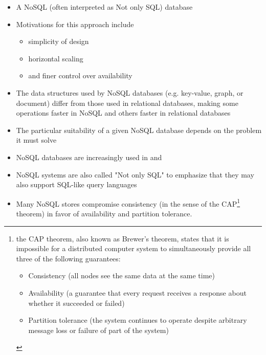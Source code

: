 \begin{itemize}
\item
A NoSQL (often interpreted as Not only SQL) database 
\item  
Motivations for this approach include 
\begin{itemize}
\item simplicity of design
\item horizontal scaling
\item and finer control over availability
\end{itemize}
\item  
The data structures used by NoSQL databases (e.g. key-value, graph, or
document) differ from those used in relational databases, making some operations faster in NoSQL and others faster in relational databases
\item  
The particular suitability of a given NoSQL database depends
on the problem it must solve
\item  
NoSQL databases are increasingly used in  and 
\item
NoSQL systems are also called "Not only SQL" to emphasize that they may also support SQL-like query languages
\item
Many
NoSQL stores compromise consistency (in the sense of the CAP\footnote{the CAP theorem, also known as Brewer's theorem, states that it is impossible for a distributed computer system to simultaneously
provide all three of the following guarantees:
\begin{itemize}
\item
Consistency (all nodes see the same data at the same time)
\item
Availability (a guarantee that every request receives a response about whether it succeeded or failed)
\item
Partition tolerance (the system continues to operate despite arbitrary message loss or failure of part of the system)
\end{itemize}
} theorem) in favor of availability and partition tolerance.
\end{itemize}


